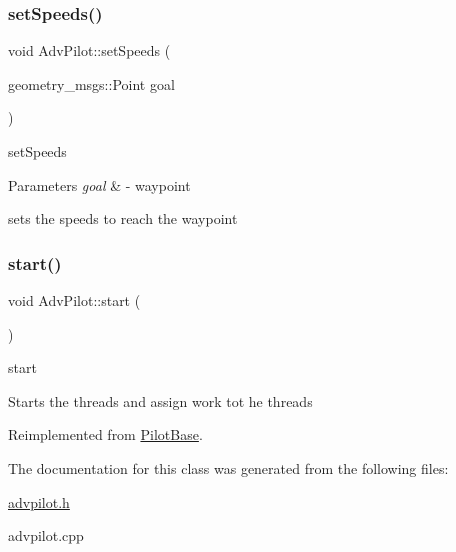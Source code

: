 \mbox{\label{classAdvPilot_af5c8b68901afc6b23569f80a349d6ca8}} 
\subsubsection{\texorpdfstring{set\+Speeds()}{setSpeeds()}}
{\footnotesize\ttfamily void Adv\+Pilot\+::set\+Speeds (\begin{DoxyParamCaption}\item[{geometry\+\_\+msgs\+::\+Point}]{goal }\end{DoxyParamCaption})\hspace{0.3cm}{\ttfamily [protected]}}



set\+Speeds 


\begin{DoxyParams}{Parameters}
{\em goal} & -\/ waypoint\\
\hline
\end{DoxyParams}
sets the speeds to reach the waypoint \mbox{\label{classAdvPilot_a8a6c363126dc017d6b3e2ca8cc761117}} 
\subsubsection{\texorpdfstring{start()}{start()}}
{\footnotesize\ttfamily void Adv\+Pilot\+::start (\begin{DoxyParamCaption}{ }\end{DoxyParamCaption})\hspace{0.3cm}{\ttfamily [virtual]}}



start 

Starts the threads and assign work tot he threads 

Reimplemented from \hyperlink{classPilotBase_a3480ea2023ca1459b32b79abf8a3400d}{Pilot\+Base}.



The documentation for this class was generated from the following files\+:\begin{DoxyCompactItemize}
\item 
\hyperlink{advpilot_8h}{advpilot.\+h}\item 
advpilot.\+cpp\end{DoxyCompactItemize}
